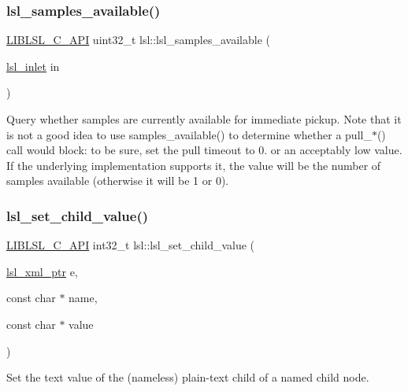 \subsubsection{\texorpdfstring{lsl\+\_\+samples\+\_\+available()}{lsl\_samples\_available()}}
{\footnotesize\ttfamily \hyperlink{lsl__cpp_8h_aafd0ef1813e8be84a1420c4f1df64615}{L\+I\+B\+L\+S\+L\+\_\+\+C\+\_\+\+A\+PI} uint32\+\_\+t lsl\+::lsl\+\_\+samples\+\_\+available (\begin{DoxyParamCaption}\item[{\hyperlink{namespacelsl_a884a3363cfcba75d7ce8f00c1c4c54f1}{lsl\+\_\+inlet}}]{in }\end{DoxyParamCaption})}

Query whether samples are currently available for immediate pickup. Note that it is not a good idea to use samples\+\_\+available() to determine whether a pull\+\_\+$\ast$() call would block\+: to be sure, set the pull timeout to 0. or an acceptably low value. If the underlying implementation supports it, the value will be the number of samples available (otherwise it will be 1 or 0). \mbox{\label{namespacelsl_a637223b4077e6cfa0392d02f9f274ba7}} 
\subsubsection{\texorpdfstring{lsl\+\_\+set\+\_\+child\+\_\+value()}{lsl\_set\_child\_value()}}
{\footnotesize\ttfamily \hyperlink{lsl__cpp_8h_aafd0ef1813e8be84a1420c4f1df64615}{L\+I\+B\+L\+S\+L\+\_\+\+C\+\_\+\+A\+PI} int32\+\_\+t lsl\+::lsl\+\_\+set\+\_\+child\+\_\+value (\begin{DoxyParamCaption}\item[{\hyperlink{namespacelsl_a5edc7a49a1a1be1634fe6dce3d59c59b}{lsl\+\_\+xml\+\_\+ptr}}]{e,  }\item[{const char $\ast$}]{name,  }\item[{const char $\ast$}]{value }\end{DoxyParamCaption})}

Set the text value of the (nameless) plain-\/text child of a named child node. \mbox{\label{namespacelsl_af13c49d3abab79ae9dd6d94ca7cdc877}} 
